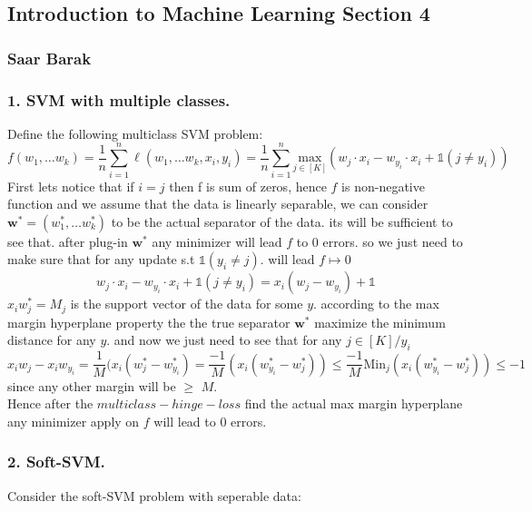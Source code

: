 \documentclass[12pt]{article}
\theoremstyle{plain}
\begin{document}
\begin{center}
\section*{Introduction to Machine Learning Section 4}
\subsubsection*{Saar Barak}
\end{center}
\subsubsection*{ 1.  SVM with multiple classes. }
Define the following multiclass SVM problem:
\[f(w_1,\dots w_k)=\frac{1}{n}\sum^n_{i=1}\ell(w_1,\dots w_k,x_i,y_i)=\frac{1}{n}\sum^n_{i=1}
\underset{j\in [K]}{\text{max}}(w_j \cdot x_i -w_{y_i}\cdot x_i + \mathds{1}(j\neq y_i) )
\]
First lets notice that if $i=j$ then f is sum of zeros, hence $f$ is non-negative function and we assume that the data is linearly separable, 
we can consider $\mathbf{w^*}=(w_1^*,\dots w_k^*) $ to be the actual separator of the data. its will be  sufficient to see  that.
after plug-in $\mathbf{w^*}$ any minimizer will lead $f$ to 0 errors. so we just need to make sure that for any update s.t $\mathds{1}(y_i\neq j)$.  will lead  $f \mapsto 0$
  \[w_j \cdot x_i -w_{y_i}\cdot x_i + \mathds{1}(j\neq y_i)=x_i(w_j-w_{y_i})+\mathds{1}
  \]
$x_iw_j^*=M_j$ is the support vector of the data for some $y$. according to the max margin hyperplane property the the true separator $\mathbf{w^*}$ maximize the minimum distance for any $y$. and now we just need to see that for any $j\in [K]/y_i$ 
  \[x_iw_j-x_iw_{y_i}=\frac{1}{M}(x_i(w_j^*-w_{y_i}^*)=\frac{-1}{M}(x_i(w_{y_i}^*-w_j^*))\leq \frac{-1}{M}\text{Min}_j(x_i(w_{y_i}^*-w_j^*))\leq -1
  \]
  since any other margin will be $\geq$  $M$.
\\ Hence after the  $multiclass-hinge-loss$ find the actual max margin hyperplane any minimizer apply on $f$ will lead to 0 errors.
\subsubsection*{ 2.  Soft-SVM. }
Consider the soft-SVM problem with seperable data:
\end{document}
